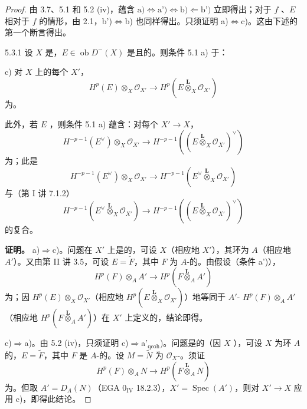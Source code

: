\begin{proof}
由 3.7、5.1 和 5.2 (iv)，蕴含 $\text{a)}\Longleftrightarrow\text{a')}\Longleftrightarrow\text{b)}\Longleftarrow\text{b')}$ 立即得出；对于 $f$ 、$E$ 相对于 $f$ 的情形，由 2.1，b')$\Longleftrightarrow$b) 也同样得出。只须证明 a)$\Longleftrightarrow$c)。这由下述的第一个断言得出。
\begin{SGAresult}{}{5.3.1}
设 $X$ 是，$E\in\operatorname{ob}D^-(X)$ 是且的。则条件 5.1 a) 于：

c) 对 $X$ 上的每个 $X'$，
\[
H^p(E)\otimes_X\mathcal O_{X'}\longrightarrow H^p(E\mathbin{\overset{\mathbf L}{\otimes}}_X\mathcal O_{X'})
\]
为。

此外，若 $E$ ，则条件 5.1 a) 蕴含：对每个 $X'\to X$，
\[
H^{-p-1}(E^\vee)\otimes_X\mathcal O_{X'}\longrightarrow
H^{-p-1}((E\mathbin{\overset{\mathbf L}{\otimes}}_X\mathcal O_{X'})^\vee)\tag{5.3.1.1}
\]
为；此是
\[
H^{-p-1}(E^\vee)\otimes_X\mathcal O_{X'}\longrightarrow
H^{-p-1}(E^\vee\mathbin{\overset{\mathbf L}{\otimes}}_X\mathcal O_{X'})
\]
与（第 I 讲 7.1.2）
\[
H^{-p-1}(E^\vee\mathbin{\overset{\mathbf L}{\otimes}}_X\mathcal O_{X'})\longrightarrow
H^{-p-1}((E\mathbin{\overset{\mathbf L}{\otimes}}_X\mathcal O_{X'})^\vee)
\]
的复合。
\end{SGAresult}
\textbf{证明。} a)$\Rightarrow$c)。问题在 $X'$ 上是的，可设 $X$（相应地 $X'$），其环为 $A$（相应地 $A'$）。又由第 II 讲 3.5，可设 $E=\widetilde F$，其中 $F$ 为 $A$-的。由假设（条件 a')），
\[
H^p(F)\otimes_AA'\longrightarrow H^p(F\mathbin{\overset{\mathbf L}{\otimes}}_AA')
\]
为；因 $H^p(E)\otimes_X\mathcal O_{X'}$（相应地 $H^p(E\mathbin{\overset{\mathbf L}{\otimes}}_X\mathcal O_{X'})$）地等同于 $A'$- $H^p(F)\otimes_AA'$（相应地 $H^p(F\mathbin{\overset{\mathbf L}{\otimes}}_AA')$）在 $X'$ 上定义的，结论即得。

c)$\Rightarrow$a)。由 5.2 (iv)，只须证明 c)$\Rightarrow$a'$_{\mathrm{qcoh}}$)。问题是的（因 $X$ ），可设 $X$ 为环 $A$ 的，$E=\widetilde F$，其中 $F$ 是 $A$-的。设 $M=\widetilde N$ 为 $\mathcal O_X$-。须证
\[
H^p(F)\otimes_AN\longrightarrow H^p(F\mathbin{\overset{\mathbf L}{\otimes}}_AN)
\]
为。但取 $A'=D_A(N)$（EGA $0_{\mathrm{IV}}$ 18.2.3），$X'=\operatorname{Spec}(A')$，则对 $X'\to X$ 应用 c)，即得此结论。


\end{proof}
